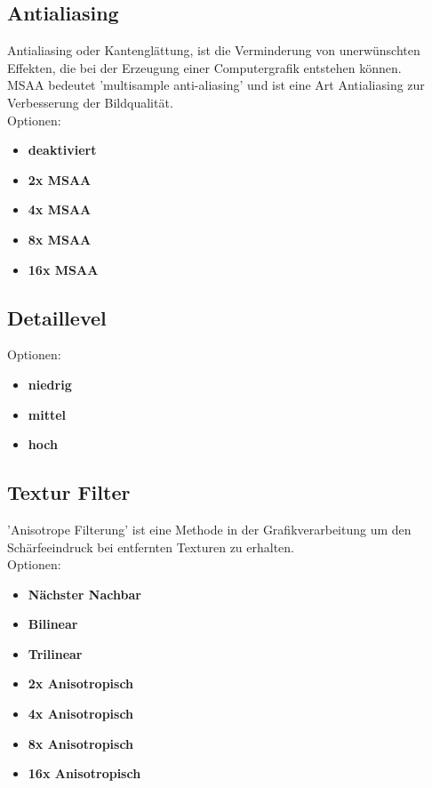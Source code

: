 \documentclass[10pt]{scrreprt}
\begin{document}
\subsection{Antialiasing}  

Antialiasing oder Kantenglättung, ist die Verminderung von unerwünschten Effekten, die bei der Erzeugung einer Computergrafik entstehen können.\\

MSAA bedeutet 'multisample anti-aliasing' und ist eine Art Antialiasing zur Verbesserung der Bildqualität.\\

Optionen:
\begin{itemize}
\item \textbf{deaktiviert}
\item \textbf{2x MSAA}
\item \textbf{4x MSAA}
\item \textbf{8x MSAA}
\item \textbf{16x MSAA}
\end{itemize}


\vspace{3mm}
\subsection{Detaillevel}  

Optionen:
\begin{itemize}
\item \textbf{niedrig}
\item \textbf{mittel}
\item \textbf{hoch}
\end{itemize}


\vspace{3mm}
\subsection{Textur Filter}  


'Anisotrope Filterung' ist eine Methode in der Grafikverarbeitung um den Schärfeeindruck bei entfernten Texturen zu erhalten.\\

Optionen:
\begin{itemize}
\item \textbf{Nächster Nachbar}
\item \textbf{Bilinear}
\item \textbf{Trilinear}
\item \textbf{2x Anisotropisch}
\item \textbf{4x Anisotropisch}
\item \textbf{8x Anisotropisch}
\item \textbf{16x Anisotropisch}
\end{itemize}
\end{document}
